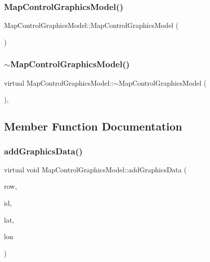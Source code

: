 \subsubsection{\texorpdfstring{MapControlGraphicsModel()}{MapControlGraphicsModel()}\hspace{0.1cm}{\footnotesize\ttfamily [3/3]}}
{\footnotesize\ttfamily Map\+Control\+Graphics\+Model\+::\+Map\+Control\+Graphics\+Model (\begin{DoxyParamCaption}\item[{\mbox{\hyperlink{class_map_control_graphics_model}{Map\+Control\+Graphics\+Model}} \&\&}]{ }\end{DoxyParamCaption})\hspace{0.3cm}{\ttfamily [default]}}

\mbox{\label{class_map_control_graphics_model_a41f14c0b71ed9e8b790d6e23677be708}} 
\subsubsection{\texorpdfstring{$\sim$MapControlGraphicsModel()}{~MapControlGraphicsModel()}}
{\footnotesize\ttfamily virtual Map\+Control\+Graphics\+Model\+::$\sim$\+Map\+Control\+Graphics\+Model (\begin{DoxyParamCaption}{ }\end{DoxyParamCaption})\hspace{0.3cm}{\ttfamily [virtual]}, {\ttfamily [default]}}



\subsection{Member Function Documentation}
\mbox{\label{class_map_control_graphics_model_ac80001f23a6059b9f8d600200920a5ea}} 
\subsubsection{\texorpdfstring{addGraphicsData()}{addGraphicsData()}}
{\footnotesize\ttfamily virtual void Map\+Control\+Graphics\+Model\+::add\+Graphics\+Data (\begin{DoxyParamCaption}\item[{int}]{row,  }\item[{int}]{id,  }\item[{float}]{lat,  }\item[{float}]{lon }\end{DoxyParamCaption})\hspace{0.3cm}{\ttfamily [pure virtual]}}



